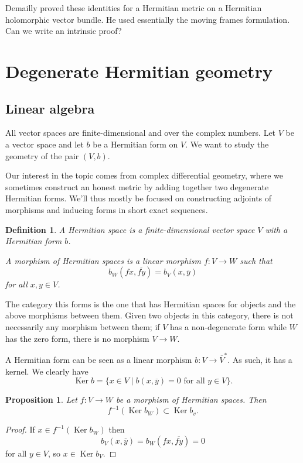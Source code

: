 \documentclass[10pt,a4paper]{article}
\newtheorem{prop}[theo]{Proposition}
\newtheorem{defi}[theo]{Definition}
\newtheorem*{proof}{Proof}
\def\ov#1{\overline{#1}}
\DeclareMathOperator{\Ker}{Ker}
\begin{document}
Demailly proved these identities for a Hermitian metric on a Hermitian holomorphic vector bundle. He used essentially the moving frames formulation. Can we write an intrinsic proof?



\section{Degenerate Hermitian geometry}
\label{sec:deglinalg}


\subsection{Linear algebra}



All vector spaces are finite-dimensional and over the complex numbers. Let $V$ be a vector space and let $b$ be a Hermitian form on $V$. We want to study the geometry of the pair $(V,b)$.

Our interest in the topic comes from complex differential geometry, where we sometimes construct an honest metric by adding together two degenerate Hermitian forms. We'll thus mostly be focused on constructing adjoints of morphisms and inducing forms in short exact sequences.

\begin{defi}
A \emph{Hermitian space} is a finite-dimensional vector space $V$ with a Hermitian form $b$.

A \emph{morphism} of Hermitian spaces is a linear morphism $f : V \to W$ such that
\[
b_W(fx, \ov{fy}) = b_V(x, \ov y)
\]
for all $x, y \in V$.
\end{defi}

The category this forms is the one that has Hermitian spaces for objects and the above morphisms between them. Given two objects in this category, there is not necessarily any morphism between them; if $V$ has a non-degenerate form while $W$ has the zero form, there is no morphism $V \to W$.

A Hermitian form can be seen as a linear morphism $b : V \to \ov V^*$. As such, it has a kernel. We clearly have
\[
\Ker b = \{ x \in V \mid b(x, \ov y) = 0 \text{ for all $y \in V$}\}.
\]

\begin{prop}
Let $f : V \to W$ be a morphism of Hermitian spaces. Then
\[
f^{-1}(\Ker b_W) \subset \Ker b_v.
\]
\end{prop}

\begin{proof}
If $x \in f^{-1}(\Ker b_W)$ then
\[
b_V(x, \ov y) = b_W(fx, \ov{fy}) = 0
\]
for all $y \in V$, so $x \in \Ker b_V$.
\end{proof}
\end{document}
